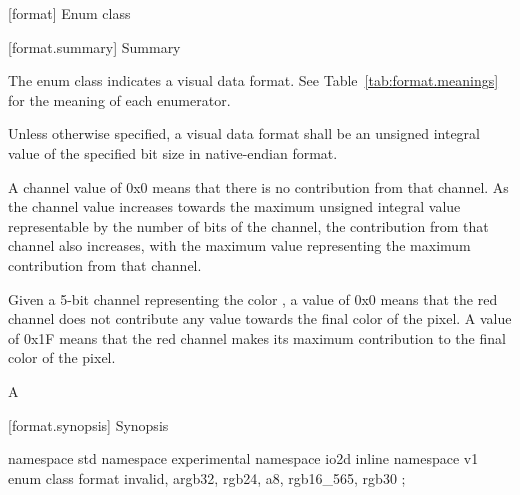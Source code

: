  [format] {Enum class }

 [format.summary] { Summary}

\pnum
The  enum class indicates a visual data format. See Table~\ref{tab:format.meanings} for 
the meaning of each  enumerator.

%
%
\pnum
Unless otherwise specified, a visual data format shall be an unsigned integral
value of the specified bit size in native-endian format.

%
\pnum
A channel value of 0x0 means that there is no contribution from that channel. 
As the channel value increases towards the maximum unsigned integral value 
representable by the number of bits of the channel, the contribution from that 
channel also increases, with the maximum value representing the maximum
contribution from that channel.
\begin{example}
Given a 5-bit channel representing the color , a value of 0x0 means that the red channel does not 
contribute any value towards the final color of the pixel. A value of 0x1F 
means that the red channel makes its maximum contribution to the final color of 
the pixel.

A
\end{example}

 [format.synopsis] { Synopsis}

\begin{codeblock}
namespace std { namespace experimental { namespace io2d { inline namespace v1 {
  enum class format {
    invalid,
    argb32,
    rgb24,
    a8,
    rgb16_565,
    rgb30
  };
} } } }
\end{codeblock}

